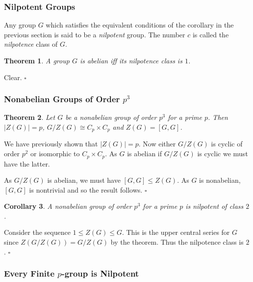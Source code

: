\documentclass[10pt]{article}
\newtheorem{theorem}{Theorem}[section]
\newtheorem{corollary}[theorem]{Corollary}
\newenvironment{proof}[1][Proof]{\begin{trivlist}
\item[\hskip \labelsep {\itshape #1}]}{\end{trivlist}}
\newenvironment{definition}[1][Definition]{\begin{trivlist}
\item[\hskip \labelsep {\bfseries #1}]}{\end{trivlist}}
\begin{document}
\subsubsection{Nilpotent Groups}

\begin{definition}
Any group $G$ which satisfies the equivalent conditions of the corollary in the previous section is said to be a \emph{nilpotent} group. The number $c$ is called the \emph{nilpotence} class of $G$.
\end{definition}

\begin{theorem}
A group $G$ is abelian iff its nilpotence class is $1$.
\end{theorem}

\begin{proof}
Clear. $\square$
\end{proof}

\subsubsection{Nonabelian Groups of Order $p^3$}

\begin{theorem}
Let $G$ be a nonabelian group of order $p^3$ for a prime $p$. Then $|Z(G)| = p$, $G/Z(G) \cong C_p\times C_p$ and $Z(G) = [G, G]$.
\end{theorem}

\begin{proof}
We have previously shown that $|Z(G)| = p$. Now either $G/Z(G)$ is cyclic of order $p^2$ or isomorphic to $C_p\times C_p$. As $G$ is abelian if $G/Z(G)$ is cyclic we must have the latter.

As $G/Z(G)$ is abelian, we must have $[G, G] \leq Z(G)$. As $G$ is nonabelian, $[G, G]$ is nontrivial and so the result follows. $\square$
\end{proof}

\begin{corollary}
A nonabelian group of order $p^3$ for a prime $p$ is nilpotent of class $2$.
\end{corollary}

\begin{proof}
Consider the sequence $1 \leq Z(G) \leq G$. This is the upper central series for $G$ since $Z(G/Z(G)) = G/Z(G)$ by the theorem. Thus the nilpotence class is $2$. $\square$
\end{proof}

\subsubsection{Every Finite $p$-group is Nilpotent}
\end{document}
